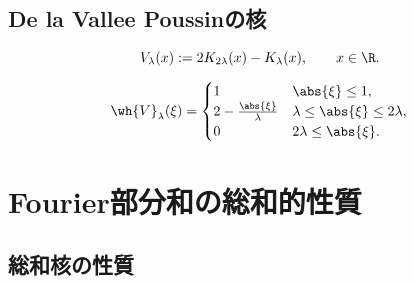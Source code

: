 \documentclass[uplatex,dvipdfmx]{jsreport}
\begin{document}
\subsection{De la Vallee Poussinの核}

\begin{definition}
    \[V_\lambda(x):=2K_{2\lambda}(x)-K_\lambda(x),\qquad x\in\R.\]
\end{definition}

\begin{proposition}
    \[\wh{V}_\lambda(\xi)=\begin{cases}
        1&\abs{\xi}\le1,\\
        2-\frac{\abs{\xi}}{\lambda}&\lambda\le\abs{\xi}\le 2\lambda,\\
        0&2\lambda\le\abs{\xi}.
    \end{cases}\]
\end{proposition}

\section{Fourier部分和の総和的性質}

\subsection{総和核の性質}
\end{document}
